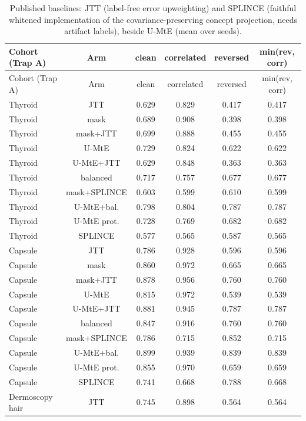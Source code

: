 {\scriptsize
\begin{longtable}{lccccc}
\caption{Published baselines: JTT (label-free error upweighting) and SPLINCE (faithful whitened implementation of the covariance-preserving concept projection, needs artifact labels), beside U-MtE (mean over seeds).}\label{tab:jtt}\\\toprule
Cohort (Trap A) & Arm & clean & correlated & reversed & min(rev, corr) \\\midrule
\endfirsthead
\toprule Cohort (Trap A) & Arm & clean & correlated & reversed & min(rev, corr) \\\midrule
\endhead
\bottomrule
\endlastfoot
Thyroid & JTT & 0.629 & 0.829 & 0.417 & 0.417 \\
Thyroid & mask & 0.689 & 0.908 & 0.398 & 0.398 \\
Thyroid & mask+JTT & 0.699 & 0.888 & 0.455 & 0.455 \\
Thyroid & U-MtE & 0.729 & 0.824 & 0.622 & 0.622 \\
Thyroid & U-MtE+JTT & 0.629 & 0.848 & 0.363 & 0.363 \\
Thyroid & balanced & 0.717 & 0.757 & 0.677 & 0.677 \\
Thyroid & mask+SPLINCE & 0.603 & 0.599 & 0.610 & 0.599 \\
Thyroid & U-MtE+bal. & 0.798 & 0.804 & 0.787 & 0.787 \\
Thyroid & U-MtE prot. & 0.728 & 0.769 & 0.682 & 0.682 \\
Thyroid & SPLINCE & 0.577 & 0.565 & 0.587 & 0.565 \\
Capsule & JTT & 0.786 & 0.928 & 0.596 & 0.596 \\
Capsule & mask & 0.860 & 0.972 & 0.665 & 0.665 \\
Capsule & mask+JTT & 0.878 & 0.956 & 0.760 & 0.760 \\
Capsule & U-MtE & 0.815 & 0.972 & 0.539 & 0.539 \\
Capsule & U-MtE+JTT & 0.881 & 0.945 & 0.787 & 0.787 \\
Capsule & balanced & 0.847 & 0.916 & 0.760 & 0.760 \\
Capsule & mask+SPLINCE & 0.786 & 0.715 & 0.852 & 0.715 \\
Capsule & U-MtE+bal. & 0.899 & 0.939 & 0.839 & 0.839 \\
Capsule & U-MtE prot. & 0.855 & 0.970 & 0.659 & 0.659 \\
Capsule & SPLINCE & 0.741 & 0.668 & 0.788 & 0.668 \\
Dermoscopy hair & JTT & 0.745 & 0.898 & 0.564 & 0.564 \\

\end{longtable}}
